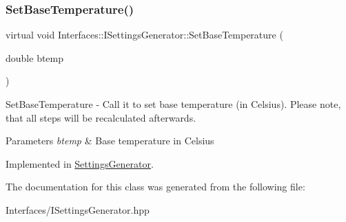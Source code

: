 \subsubsection{\texorpdfstring{Set\+Base\+Temperature()}{SetBaseTemperature()}}
{\footnotesize\ttfamily virtual void Interfaces\+::\+I\+Settings\+Generator\+::\+Set\+Base\+Temperature (\begin{DoxyParamCaption}\item[{double}]{btemp }\end{DoxyParamCaption})\hspace{0.3cm}{\ttfamily [pure virtual]}}



Set\+Base\+Temperature -\/ Call it to set base temperature (in Celsius). Please note, that all steps will be recalculated afterwards. 


\begin{DoxyParams}{Parameters}
{\em btemp} & Base temperature in Celsius \\
\hline
\end{DoxyParams}


Implemented in \hyperlink{class_settings_generator_aed9e7acb30bfd559b1ac70ceeddd8973}{Settings\+Generator}.



The documentation for this class was generated from the following file\+:\begin{DoxyCompactItemize}
\item 
Interfaces/I\+Settings\+Generator.\+hpp\end{DoxyCompactItemize}
